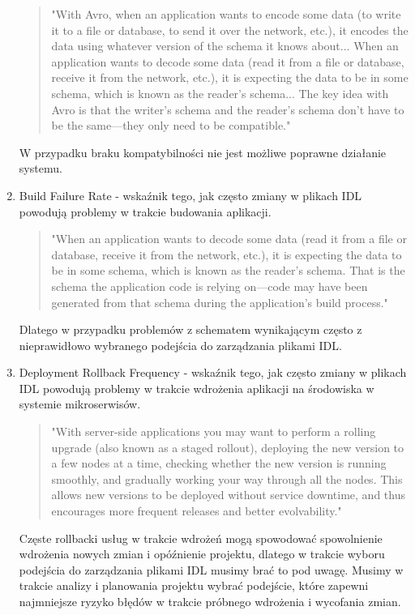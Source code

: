 \documentclass[runningheads,12pt]{llncs}
\begin{document}
\begin{enumerate}
    \begin{quote}
        "With Avro, when an application wants to encode some data (to write it to a file or database, to send it over the network, etc.), it encodes the data using whatever version of the schema it knows about... When an application wants to decode some data (read it from a file or database, receive it from the network, etc.), it is expecting the data to be in some schema, which is known as the reader’s schema... The key idea with Avro is that the writer’s schema and the reader’s schema don’t have to be the same—they only need to be compatible." ~\cite[p. 123]{kleppmann2017designing}
    \end{quote}
    W przypadku braku kompatybilności nie jest możliwe poprawne działanie systemu.
    \item Build Failure Rate - wskaźnik tego, jak często zmiany w plikach IDL powodują problemy w trakcie budowania aplikacji.
    \begin{quote}
        "When an application wants to decode some data (read it from a file or database, receive it from the network, etc.), it is expecting the data to be in some schema, which is known as the reader’s schema. That is the schema the application code is relying on—code may have been generated from that schema during the application’s build process." ~\cite[p. 123]{kleppmann2017designing}
    \end{quote}
    Dlatego w przypadku problemów z schematem wynikającym często z nieprawidłowo wybranego podejścia do zarządzania plikami IDL.
    \item Deployment Rollback Frequency - wskaźnik tego, jak często zmiany w plikach IDL powodują problemy w trakcie wdrożenia aplikacji na środowiska w systemie mikroserwisów.
    \begin{quote}
        "With server-side applications you may want to perform a rolling upgrade (also known as a staged rollout), deploying the new version to a few nodes at a time, checking whether the new version is running smoothly, and gradually working your way through all the nodes. This allows new versions to be deployed without service downtime, and thus encourages more frequent releases and better evolvability." ~\cite[p. 92]{kleppmann2017designing}
    \end{quote}
    Częste rollbacki usług w trakcie wdrożeń mogą spowodować spowolnienie wdrożenia nowych zmian i opóźnienie projektu, dlatego w trakcie wyboru podejścia do zarządzania plikami IDL musimy brać to pod uwagę. Musimy w trakcie analizy i planowania projektu wybrać podejście, które zapewni najmniejsze ryzyko błędów w trakcie próbnego wdrożenia i wycofania zmian.
\end{enumerate}
    
\end{document}
